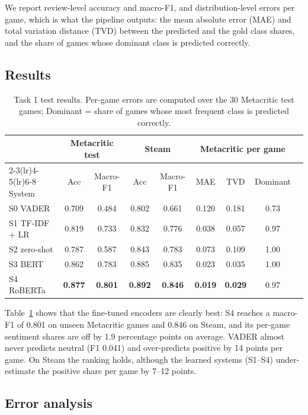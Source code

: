 \documentclass[11pt,a4paper]{article}
\begin{document}
We report review-level accuracy and macro-F1, and distribution-level errors per game, which is
what the pipeline outputs: the mean absolute error (MAE) and total variation distance (TVD)
between the predicted and the gold class shares, and the share of games whose dominant class
is predicted correctly.

\subsection{Results}

\begin{table}[t]
  \centering
  \small
  \begin{tabular}{lcccccccc}
    \toprule
    & \multicolumn{2}{c}{Metacritic test} & \multicolumn{2}{c}{Steam} &
      \multicolumn{3}{c}{Metacritic per game} \\
    \cmidrule(lr){2-3}\cmidrule(lr){4-5}\cmidrule(lr){6-8}
    System & Acc & Macro-F1 & Acc & Macro-F1 & MAE & TVD & Dominant \\
    \midrule
    S0 VADER & 0.709 & 0.484 & 0.802 & 0.661 & 0.120 & 0.181 & 0.73 \\
    S1 TF-IDF + LR & 0.819 & 0.733 & 0.832 & 0.776 & 0.038 & 0.057 & 0.97 \\
    S2 zero-shot & 0.787 & 0.587 & 0.843 & 0.783 & 0.073 & 0.109 & 1.00 \\
    S3 BERT & 0.862 & 0.783 & 0.885 & 0.835 & 0.023 & 0.035 & 1.00 \\
    S4 RoBERTa & \textbf{0.877} & \textbf{0.801} & \textbf{0.892} & \textbf{0.846} &
      \textbf{0.019} & \textbf{0.029} & 0.97 \\
    \bottomrule
  \end{tabular}
  \caption{Task 1 test results. Per-game errors are computed over the 30 Metacritic test
  games; Dominant = share of games whose most frequent class is predicted correctly.}
  \label{tab:t1results}
\end{table}

Table~\ref{tab:t1results} shows that the fine-tuned encoders are clearly best: S4 reaches a
macro-F1 of 0.801 on unseen Metacritic games and 0.846 on Steam, and its per-game sentiment
shares are off by 1.9 percentage points on average. VADER almost never predicts neutral
(F1 0.041) and over-predicts positive by 14 points per game. On Steam the ranking holds,
although the learned systems (S1--S4) under-estimate the positive share per game by 7--12
points.

\subsection{Error analysis}
\end{document}
